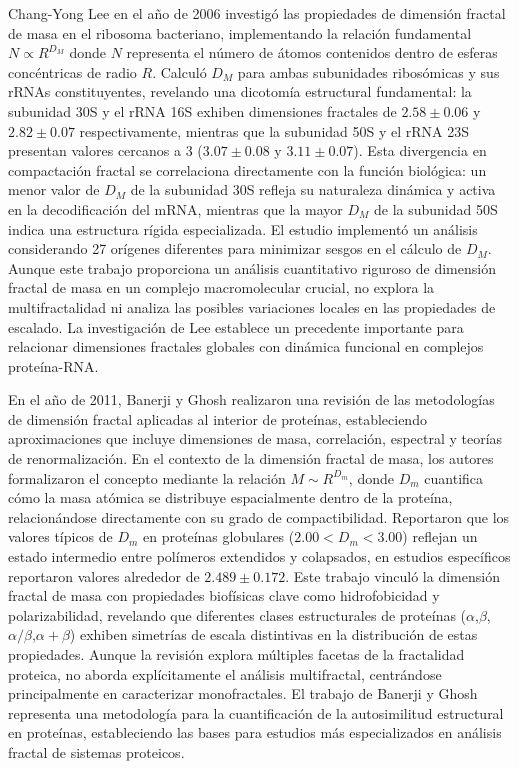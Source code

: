 Chang-Yong Lee en el año de 2006\cite{Lee2006} investigó las propiedades de dimensión fractal de masa en el ribosoma bacteriano, implementando la relación fundamental $N \propto R^{D_M}$ donde $N$ representa el número de átomos contenidos dentro de esferas concéntricas de radio $R$. Calculó $D_M$ para ambas subunidades ribosómicas y sus rRNAs constituyentes, revelando una dicotomía estructural fundamental: la subunidad 30S y el rRNA 16S exhiben dimensiones fractales de $2.58 \pm 0.06$ y $2.82 \pm 0.07$ respectivamente, mientras que la subunidad 50S y el rRNA 23S presentan valores cercanos a 3 ($3.07 \pm 0.08$ y $3.11 \pm 0.07$). Esta divergencia en compactación fractal se correlaciona directamente con la función biológica: un menor valor de $D_M$ de la subunidad 30S refleja su naturaleza dinámica y activa en la decodificación del mRNA, mientras que la mayor $D_M$ de la subunidad 50S indica una estructura rígida especializada. El estudio implementó un análisis considerando 27 orígenes diferentes para minimizar sesgos en el cálculo de $D_M$. Aunque este trabajo proporciona un análisis cuantitativo riguroso de dimensión fractal de masa en un complejo macromolecular crucial, no explora la multifractalidad ni analiza las posibles variaciones locales en las propiedades de escalado. La investigación de Lee establece un precedente importante para relacionar dimensiones fractales globales con dinámica funcional en complejos proteína-RNA.
	
En el año de 2011, Banerji y Ghosh \cite{Banerji2011} realizaron una revisión de las metodologías de dimensión fractal aplicadas al interior de proteínas, estableciendo aproximaciones que incluye dimensiones de masa, correlación, espectral y teorías de renormalización. En el contexto de la dimensión fractal de masa, los autores formalizaron el concepto mediante la relación $M \sim R^{D_m}$, donde $D_m$ cuantifica cómo la masa atómica se distribuye espacialmente dentro de la proteína, relacionándose directamente con su grado de compactibilidad. Reportaron que los valores típicos de $D_m$ en proteínas globulares ($2.00 < D_m < 3.00$) reflejan un estado intermedio entre polímeros extendidos y colapsados, en estudios específicos reportaron valores alrededor de $2.489 \pm 0.172$. Este trabajo vinculó la dimensión fractal de masa con propiedades biofísicas clave como hidrofobicidad y polarizabilidad, revelando que diferentes clases estructurales de proteínas ($\alpha$,$\beta$,$\alpha/\beta$,$\alpha+\beta$) exhiben simetrías de escala distintivas en la distribución de estas propiedades. Aunque la revisión explora múltiples facetas de la fractalidad proteica, no aborda explícitamente el análisis multifractal, centrándose principalmente en caracterizar monofractales. El trabajo de Banerji y Ghosh representa una metodología para la cuantificación de la autosimilitud estructural en proteínas, estableciendo las bases para estudios más especializados en análisis fractal de sistemas proteicos.


